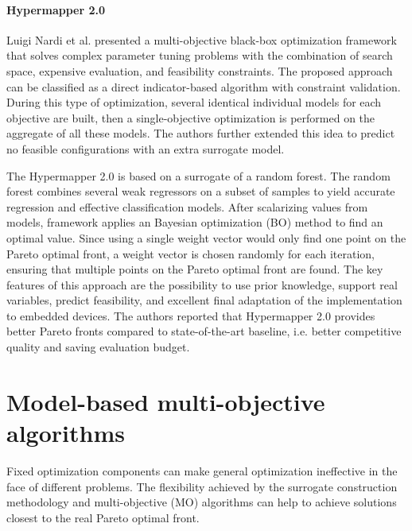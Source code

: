         \paragraph{Hypermapper 2.0} Luigi Nardi et al. \cite{nardi2019practical} presented a multi-objective black-box optimization framework that solves complex parameter tuning problems with the combination of search space, expensive evaluation, and feasibility constraints.
        The proposed approach can be classified as a direct indicator-based algorithm with constraint validation. During this type of optimization, several identical individual models for each objective are built, then a single-objective optimization is performed on the aggregate of all these models. The authors further extended this idea to predict no feasible configurations with an extra surrogate model.
        
        The Hypermapper 2.0 is based on a surrogate of a random forest. The random forest combines several weak regressors on a subset of samples to yield accurate regression and effective classification models. After scalarizing values from models, framework applies an Bayesian optimization (BO) method to find an optimal value. Since using a single weight vector would only find one point on the Pareto optimal front, a weight vector is chosen randomly for each iteration, ensuring that multiple points on the Pareto optimal front are found. The key features of this approach are the possibility to use prior knowledge, support real variables, predict feasibility, and excellent final adaptation of the implementation to embedded devices. The authors reported that Hypermapper 2.0 provides better Pareto fronts compared to state-of-the-art baseline, i.e. better competitive quality and saving evaluation budget.
        

    \section{Model-based multi-objective algorithms}
        Fixed optimization components can make general optimization ineffective in the face of different problems. The flexibility achieved by the surrogate construction methodology and multi-objective (MO) algorithms can help to achieve solutions closest to the real Pareto optimal front.

